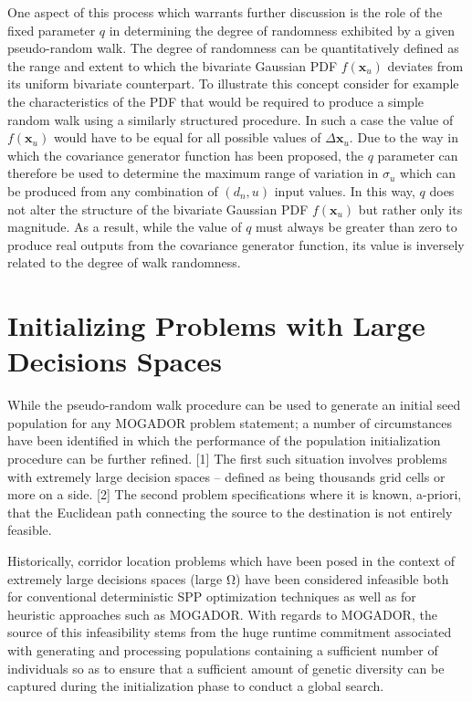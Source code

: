 One aspect of this process which warrants further discussion is the role of the fixed parameter $q$ in determining the degree of randomness exhibited by a given pseudo-random walk. The degree of randomness can be quantitatively defined as the range and extent to which the bivariate Gaussian PDF $f(\textbf{x}_u)$ deviates from its uniform bivariate counterpart. To illustrate this concept consider for example the characteristics of the PDF that would be required to produce a simple random walk using a similarly structured procedure. In such a case the value of $f(\textbf{x}_u)$ would have to be equal for all possible values of $\Delta\textbf{x}_u$. Due to the way in which the covariance generator function has been proposed, the $q$ parameter can therefore be used to determine the maximum range of variation in $\sigma_u$ which can be produced from any combination of $(d_n,u)$ input values. In this way, $q$ does not alter the structure of the bivariate Gaussian PDF $f(\textbf{x}_u)$ but rather only its magnitude. As a result, while the value of $q$ must always be greater than zero to produce real outputs from the covariance generator function, its value is inversely related to the degree of walk randomness. 

\section{Initializing Problems with Large Decisions Spaces}
    
While the pseudo-random walk procedure can be used to generate an initial seed population for any MOGADOR problem statement; a number of circumstances have been identified in which the performance of the population initialization procedure can be further refined. [1] The first such situation involves problems with extremely large decision spaces – defined as being thousands grid cells or more on a side. [2] The second problem specifications where it is known, a-priori, that the Euclidean path connecting the source to the destination is not entirely feasible.
            
Historically, corridor location problems which have been posed in the context of extremely large decisions spaces (large Ω) have been considered infeasible both for conventional deterministic SPP optimization techniques as well as for heuristic approaches such as MOGADOR. With regards to MOGADOR, the source of this infeasibility stems from the huge runtime commitment associated with generating and processing populations containing a sufficient number of individuals so as to ensure that a sufficient amount of genetic diversity can be captured during the initialization phase to conduct a global search. 

